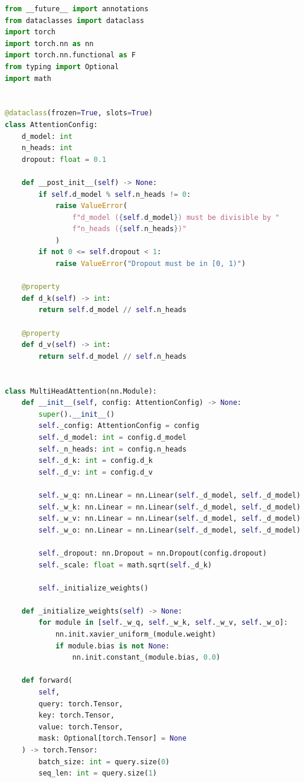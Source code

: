 \begin{lstlisting}[language=Python, caption=Multi-Head Attention Implementation]
from __future__ import annotations
from dataclasses import dataclass
import torch
import torch.nn as nn
import torch.nn.functional as F
from typing import Optional
import math


@dataclass(frozen=True, slots=True)
class AttentionConfig:
    d_model: int
    n_heads: int
    dropout: float = 0.1

    def __post_init__(self) -> None:
        if self.d_model % self.n_heads != 0:
            raise ValueError(
                f"d_model ({self.d_model}) must be divisible by "
                f"n_heads ({self.n_heads})"
            )
        if not 0 <= self.dropout < 1:
            raise ValueError("Dropout must be in [0, 1)")

    @property
    def d_k(self) -> int:
        return self.d_model // self.n_heads

    @property
    def d_v(self) -> int:
        return self.d_model // self.n_heads


class MultiHeadAttention(nn.Module):
    def __init__(self, config: AttentionConfig) -> None:
        super().__init__()
        self._config: AttentionConfig = config
        self._d_model: int = config.d_model
        self._n_heads: int = config.n_heads
        self._d_k: int = config.d_k
        self._d_v: int = config.d_v

        self._w_q: nn.Linear = nn.Linear(self._d_model, self._d_model)
        self._w_k: nn.Linear = nn.Linear(self._d_model, self._d_model)
        self._w_v: nn.Linear = nn.Linear(self._d_model, self._d_model)
        self._w_o: nn.Linear = nn.Linear(self._d_model, self._d_model)

        self._dropout: nn.Dropout = nn.Dropout(config.dropout)
        self._scale: float = math.sqrt(self._d_k)

        self._initialize_weights()

    def _initialize_weights(self) -> None:
        for module in [self._w_q, self._w_k, self._w_v, self._w_o]:
            nn.init.xavier_uniform_(module.weight)
            if module.bias is not None:
                nn.init.constant_(module.bias, 0.0)

    def forward(
        self,
        query: torch.Tensor,
        key: torch.Tensor,
        value: torch.Tensor,
        mask: Optional[torch.Tensor] = None
    ) -> torch.Tensor:
        batch_size: int = query.size(0)
        seq_len: int = query.size(1)


\end{lstlisting}
